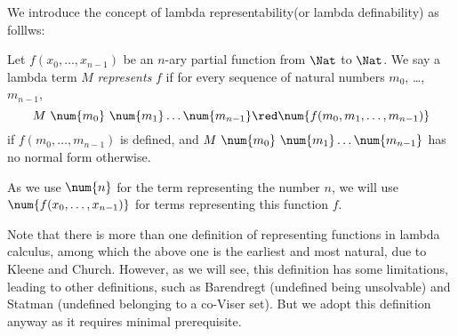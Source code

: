 \documentclass[../../../include/open-logic-section]{subfiles}
\begin{document}

We introduce the concept of lambda representability(or
lambda definability) as folllws:
\begin{defn}
Let $f(x_0, \dots, x_{n-1})$ be an $n$-ary partial function from $\Nat$
to $\Nat$. We say a lambda term $M$ \emph{represents} $f$ if for every
sequence of natural numbers $m_0$, \dots,~$m_{n-1}$,
\[
M ~ \num{m_0} ~ \num{m_1} \dots \num{m_{n-1}} \red \num{f(m_0, m_1, \dots,
  m_{n-1})}
\]
if $f(m_0, \dots, m_{n-1})$ is defined, and $M ~ \num{m_0} ~ \num{m_1}
\dots \num{m_{n-1}}$ has no normal form otherwise. 
\end{defn}

As we use $\num{n}$ for the term representing the number $n$, we will
use $\num{f(x_0, \dots, x_{n-1})}$ for terms representing this
function $f$.

Note that there is more than one definition of representing functions in lambda
calculus, among which the above one is the earliest and most natural,
due to Kleene and Church. However, as we will see, this definition has
some limitations, leading to other definitions, such as
Barendregt (undefined being unsolvable) and Statman (undefined belonging
to a co-Viser set). But we adopt this definition anyway as it requires
minimal prerequisite.
\end{document}

